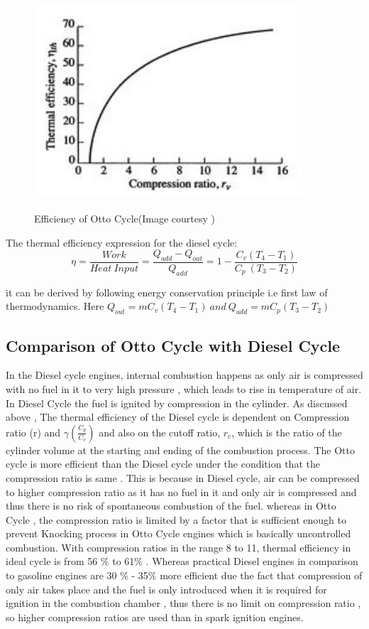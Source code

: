 \documentclass[11pt]{article}
\begin{document}
\begin{figure}[!h]
  \centering
    \vspace*{0 cm}
  \includegraphics[height=80mm,width=100mm]{Efficiency.jpeg}
    \caption{Efficiency of Otto Cycle(Image courtesy \cite{ref14})}
  \label{fig:Otto Cycle Efficiency}
\end{figure}

The thermal efficiency expression for the diesel cycle:
\[ \eta = \frac{Work}{Heat \  Input} = \frac{Q_{add}-Q_{out}}{Q_{add}} = 1 - \frac{C_v(T_4 - T_1)}{C_p\ (T_3 - T_2)}\]

it can be derived by following energy conservation principle i.e first law of thermodynamics. Here $Q_{out} = m C_v (T_4 - T_1)\  and\  Q_{add} = m C_p (T_3 - T_2) $  

\subsection{Comparison of Otto Cycle with Diesel Cycle} 
In the Diesel cycle engines, internal combustion happens as only air is compressed with no fuel in it to very high pressure , which leads to rise in temperature of air. In Diesel Cycle the fuel is ignited by compression in the cylinder. As discussed above , The thermal efficiency of the Diesel cycle is dependent on Compression ratio (r)  and $ \gamma ( \frac{C_p}{C_v} ) $  and also on the cutoff ratio, $ r_c $, which is the ratio of the cylinder volume at the starting and ending of the combustion process.
The Otto cycle is more efficient than the Diesel cycle under the condition that the compression ratio is same \cite{ref17} . This is because in Diesel cycle, air can be compressed to higher compression ratio as it has no fuel in it and only air is compressed and thus there is no risk of spontaneous combustion of the fuel. whereas in Otto Cycle , the compression ratio is limited by a factor that is sufficient enough to prevent Knocking process in Otto Cycle engines which is basically uncontrolled combustion. 
With compression ratios in the range 8 to 11, thermal efficiency in ideal cycle is from 56 \% to 61\% .
Whereas practical Diesel engines in comparison to gasoline engines are 30 \% - 35\% more efficient due the fact that compression of only air takes place and the fuel is only introduced when it is required for ignition in the combustion chamber , thus there is no limit on compression ratio , so higher compression  ratios are used than in spark ignition engines.
\end{document}

